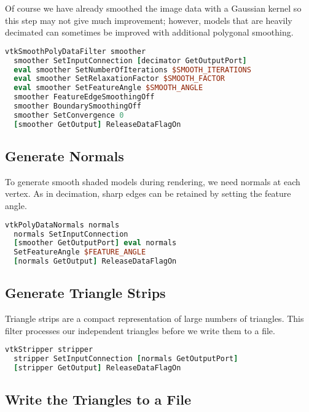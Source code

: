 Of course we have already smoothed the image data with a Gaussian kernel so this step may not give much improvement; however, models that are heavily decimated can sometimes be improved with additional polygonal smoothing.

\begin{lstlisting}[language=TCL, caption={Smooth the Triangle Vertices.}]
vtkSmoothPolyDataFilter smoother
  smoother SetInputConnection [decimator GetOutputPort]
  eval smoother SetNumberOfIterations $SMOOTH_ITERATIONS
  eval smoother SetRelaxationFactor $SMOOTH_FACTOR
  eval smoother SetFeatureAngle $SMOOTH_ANGLE
  smoother FeatureEdgeSmoothingOff
  smoother BoundarySmoothingOff
  smoother SetConvergence 0
  [smoother GetOutput] ReleaseDataFlagOn
\end{lstlisting}

\subsection{Generate Normals}
To generate smooth shaded models during rendering, we need normals at each vertex. As in decimation, sharp edges can be retained by setting the feature angle.

\begin{lstlisting}[language=TCL, caption={Generate Normals.}]
vtkPolyDataNormals normals
  normals SetInputConnection
  [smoother GetOutputPort] eval normals
  SetFeatureAngle $FEATURE_ANGLE
  [normals GetOutput] ReleaseDataFlagOn
\end{lstlisting}

\subsection{Generate Triangle Strips}

Triangle strips are a compact representation of large numbers of triangles. This filter processes our independent triangles before we write them to a file.

\begin{lstlisting}[language=TCL, caption={Generate Triangle Strips.}]
vtkStripper stripper
  stripper SetInputConnection [normals GetOutputPort]
  [stripper GetOutput] ReleaseDataFlagOn
\end{lstlisting}

\subsection{Write the Triangles to a File}

